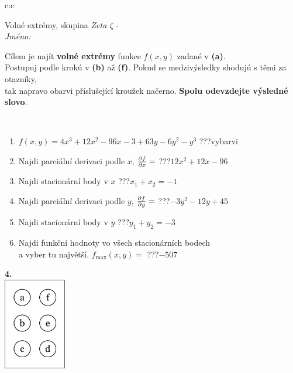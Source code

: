 \documentclass[10pt]{report}
\begin{document}
\begin{tabular}{c:c}
\begin{minipage}[c][104.5mm][t]{0.5\linewidth}
\begin{center}
\vspace{7mm}
{\huge Volné extrémy, skupina \textit{Zeta $\zeta$} -}\\[5mm]
\textit{Jméno:}\phantom{xxxxxxxxxxxxxxxxxxxxxxxxxxxxxxxxxxxxxxxxxxxxxxxxxxxxxxxxxxxxxxxxx}\\[5mm]
\begin{minipage}{0.95\linewidth}
\begin{center}
Cílem je najít \textbf{volné extrémy} funkce $f(x,y)$ zadané v \textbf{(a)}.\\Postupuj podle krokú v \textbf{(b)} až \textbf{(f)}. Pokud se medzivýsledky shodujú s těmi za otazníky,\\tak napravo obarvi příslušející kroužek načerno. \textbf{Spolu odevzdejte výsledné slovo}.
\end{center}
\end{minipage}
\\[1mm]
\begin{minipage}{0.79\linewidth}
\begin{center}
\begin{varwidth}{\linewidth}
\begin{enumerate}
\normalsize
\item $f(x,y)=4x^3+12x^2-96x-3+63y-6y^2-y^3$\quad \dotfill\; ???\;\dotfill \quad vybarvi
\item Najdi parciální derivaci podle $x$, $\pdv{f}{x}=$\quad \dotfill\; ???\;\dotfill \quad $12x^2+12x-96$
\item Najdi stacionární body v $x$\quad \dotfill\; ???\;\dotfill \quad $x_1+x_2=-1$
\item Najdi parciální derivaci podle $y$, $\pdv{f}{y}=$\quad \dotfill\; ???\;\dotfill \quad $-3y^2-12y+45$
\item Najdi stacionární body v $y$\quad \dotfill\; ???\;\dotfill \quad $y_1+y_2=-3$
\item Najdi funkční hodnoty vo všech stacionárních bodech \\ \phantom{xxxxxx} a vyber tu najvětší. $f_{\text{max}}(x,y)=$\quad \dotfill\; ???\;\dotfill \quad $-507$
\end{enumerate}
\end{varwidth}
\end{center}
\end{minipage}
\begin{minipage}{0.20\linewidth}
\begin{center}
{\Huge\bfseries 4.} \\[2mm]
\includegraphics[height=40mm]{../images/braille.png}

\end{center}
\end{minipage}
\end{center}
\end{minipage}
\end{tabular}
\end{document}
